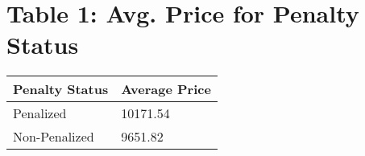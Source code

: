 \section*{Table 1: Avg. Price for Penalty Status}
\begin{tabular}{ll}
\toprule
Penalty Status &  Average Price \\
\midrule
     Penalized &       10171.54 \\
 Non-Penalized &        9651.82 \\
\bottomrule
\end{tabular}
